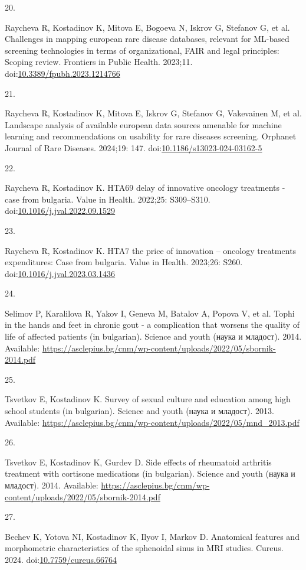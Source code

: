 \documentclass[
  12pt,
  letterpaper,
  DIV=11,
  numbers=noendperiod]{scrartcl}
\newlength{\cslhangindent}
\newlength{\csllabelwidth}
\newenvironment{CSLReferences}[2] %
 {\begin{list}{}{%
  \setlength{\itemindent}{0pt}
  \setlength{\leftmargin}{0pt}
  \setlength{\parsep}{0pt}
  \ifodd #1
   \setlength{\leftmargin}{\cslhangindent}
   \setlength{\itemindent}{-1\cslhangindent}
  \fi
  \setlength{\itemsep}{#2\baselineskip}}}
 {\end{list}}
\newcommand{\CSLLeftMargin}[1]{\parbox[t]{\csllabelwidth}{\strut#1\strut}}
\newcommand{\CSLRightInline}[1]{\parbox[t]{\linewidth - \csllabelwidth}{\strut#1\strut}}
\begin{document}
\begin{CSLReferences}{0}{1}
\CSLLeftMargin{20. }%
\CSLRightInline{Raycheva R, Kostadinov K, Mitova E, Bogoeva N, Iskrov G,
Stefanov G, et al. Challenges in mapping european rare disease
databases, relevant for ML-based screening technologies in terms of
organizational, FAIR and legal principles: Scoping review. Frontiers in
Public Health. 2023;11.
doi:\href{https://doi.org/10.3389/fpubh.2023.1214766}{10.3389/fpubh.2023.1214766}}

\CSLLeftMargin{21. }%
\CSLRightInline{Raycheva R, Kostadinov K, Mitova E, Iskrov G, Stefanov
G, Vakevainen M, et al. Landscape analysis of available european data
sources amenable for machine learning and recommendations on usability
for rare diseases screening. Orphanet Journal of Rare Diseases. 2024;19:
147.
doi:\href{https://doi.org/10.1186/s13023-024-03162-5}{10.1186/s13023-024-03162-5}}

\CSLLeftMargin{22. }%
\CSLRightInline{Raycheva R, Kostadinov K. HTA69 delay of innovative
oncology treatments - case from bulgaria. Value in Health. 2022;25:
S309--S310.
doi:\href{https://doi.org/10.1016/j.jval.2022.09.1529}{10.1016/j.jval.2022.09.1529}}

\CSLLeftMargin{23. }%
\CSLRightInline{Raycheva R, Kostadinov K. HTA7 the price of innovation
-- oncology treatments expenditures: Case from bulgaria. Value in
Health. 2023;26: S260.
doi:\href{https://doi.org/10.1016/j.jval.2023.03.1436}{10.1016/j.jval.2023.03.1436}}

\CSLLeftMargin{24. }%
\CSLRightInline{Selimov P, Karalilova R, Yakov I, Geneva M, Batalov A,
Popova V, et al. Tophi in the hands and feet in chronic gout - a
complication that worsens the quality of life of affected patients (in
bulgarian). Science and youth (наука и младост). 2014. Available:
\url{https://asclepius.bg/cnm/wp-content/uploads/2022/05/sbornik-2014.pdf}}

\CSLLeftMargin{25. }%
\CSLRightInline{Tsvetkov E, Kostadinov K. Survey of sexual culture and
education among high school students (in bulgarian). Science and youth
(наука и младост). 2013. Available:
\url{https://asclepius.bg/cnm/wp-content/uploads/2022/05/mnd_2013.pdf}}

\CSLLeftMargin{26. }%
\CSLRightInline{Tsvetkov E, Kostadinov K, Gurdev D. Side effects of
rheumatoid arthritis treatment with cortisone medications (in
bulgarian). Science and youth (наука и младост). 2014. Available:
\url{https://asclepius.bg/cnm/wp-content/uploads/2022/05/sbornik-2014.pdf}}

\CSLLeftMargin{27. }%
\CSLRightInline{Bechev K, Yotova NI, Kostadinov K, Ilyov I, Markov D.
Anatomical features and morphometric characteristics of the sphenoidal
sinus in MRI studies. Cureus. 2024.
doi:\href{https://doi.org/10.7759/cureus.66764}{10.7759/cureus.66764}}

\end{CSLReferences}
\end{document}
